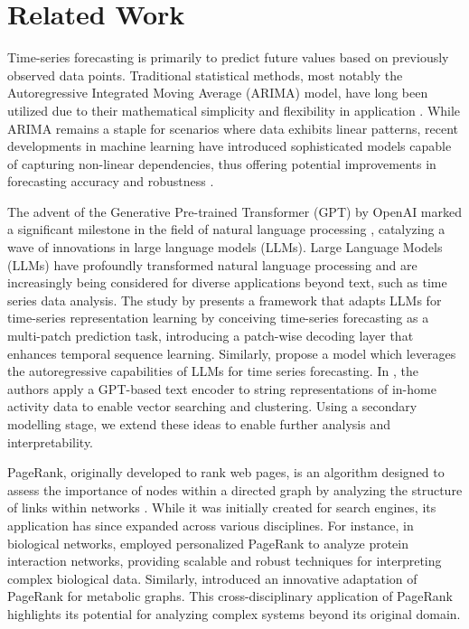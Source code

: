 \section{Related Work}
Time-series forecasting is primarily to predict future values based on previously observed data points. Traditional statistical methods, most notably the Autoregressive Integrated Moving Average (ARIMA) model, have long been utilized due to their mathematical simplicity and flexibility in application \citep{rizvi_arima_2024,kontopoulou_review_2023}. While ARIMA remains a staple for scenarios where data exhibits linear patterns, recent developments in machine learning have introduced sophisticated models capable of capturing non-linear dependencies, thus offering potential improvements in forecasting accuracy and robustness \citep{masini_machine_2023,rhanoui_forecasting_2019}.

The advent of the Generative Pre-trained Transformer (GPT) by OpenAI marked a significant milestone in the field of natural language processing \citep{brown_language_2020}, catalyzing a wave of innovations in large language models (LLMs). Large Language Models (LLMs) have profoundly transformed natural language processing and are increasingly being considered for diverse applications beyond text, such as time series data analysis. The study by \citep{bian_multi-patch_2024} presents a framework that adapts LLMs for time-series representation learning by conceiving time-series forecasting as a multi-patch prediction task, introducing a patch-wise decoding layer that enhances temporal sequence learning. Similarly, \citep{liu_autotimes_2024} propose a model which leverages the autoregressive capabilities of LLMs for time series forecasting. In \citet{capstick2024representation}, the authors apply a GPT-based text encoder to string representations of in-home activity data to enable vector searching and clustering. Using a secondary modelling stage, we extend these ideas to enable further analysis and interpretability.

PageRank, originally developed to rank web pages, is an algorithm designed to assess the importance of nodes within a directed graph by analyzing the structure of links within networks \citep{page_pagerank_1999}. While it was initially created for search engines, its application has since expanded across various disciplines. For instance, in biological networks, \citep{ivan_when_2011} employed personalized PageRank to analyze protein interaction networks, providing scalable and robust techniques for interpreting complex biological data. Similarly, \citep{banky_equal_2013} introduced an innovative adaptation of PageRank for metabolic graphs. This cross-disciplinary application of PageRank highlights its potential for analyzing complex systems beyond its original domain.